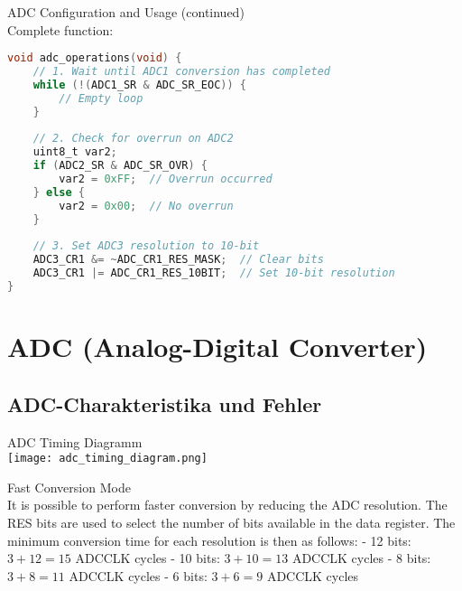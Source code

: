 \begin{example2}{ADC Configuration and Usage (continued)}\\
Complete function:
\begin{lstlisting}[language=C, style=basesmol]
void adc_operations(void) {
    // 1. Wait until ADC1 conversion has completed
    while (!(ADC1_SR & ADC_SR_EOC)) {
        // Empty loop
    }
    
    // 2. Check for overrun on ADC2
    uint8_t var2;
    if (ADC2_SR & ADC_SR_OVR) {
        var2 = 0xFF;  // Overrun occurred
    } else {
        var2 = 0x00;  // No overrun
    }
    
    // 3. Set ADC3 resolution to 10-bit
    ADC3_CR1 &= ~ADC_CR1_RES_MASK;  // Clear bits
    ADC3_CR1 |= ADC_CR1_RES_10BIT;  // Set 10-bit resolution
}
\end{lstlisting}
\end{example2}

\section{ADC (Analog-Digital Converter)}

\subsection{ADC-Charakteristika und Fehler}

\begin{KR}{ADC Timing Diagramm}\\
    \texttt{[image: adc\_timing\_diagram.png]}
\end{KR}

\begin{concept}{Fast Conversion Mode}\\
    It is possible to perform faster conversion by reducing the ADC resolution. The RES bits are used to select the number of bits available in the data register. The minimum conversion time for each resolution is then as follows:
- 12 bits: $3+12=15$ ADCCLK cycles
- 10 bits: $3+10=13$ ADCCLK cycles
- 8 bits: $3+8=11$ ADCCLK cycles
- 6 bits: $3+6=9$ ADCCLK cycles
\end{concept}


